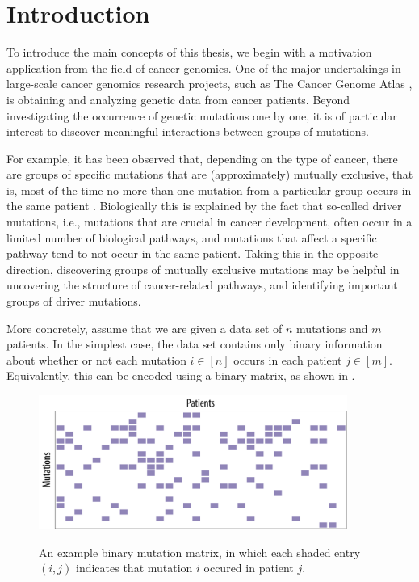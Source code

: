 \chapter{Introduction} \label{ch:intro}
To introduce the main concepts of this thesis, we begin with a motivation application from the field of cancer genomics.
One of the major undertakings in large-scale cancer genomics research projects, such as The Cancer Genome Atlas \citep{tcga}, is obtaining and analyzing genetic data from cancer patients.
Beyond investigating the occurrence of genetic mutations one by one, it is of particular interest to discover meaningful interactions between groups of mutations.

For example, it has been observed that, depending on the type of cancer, there are groups of specific mutations that are (approximately) mutually exclusive, that is, most of the time no more than one mutation from a particular group occurs in the same patient \citep{yeang08}.
Biologically this is explained by the fact that so-called driver mutations, i.e., mutations that are crucial in cancer development, often occur in a limited number of biological pathways, and mutations that affect a specific pathway tend to not occur in the same patient.
Taking this in the opposite direction, discovering groups of mutually exclusive mutations may be helpful in uncovering the structure of cancer-related pathways, and identifying important groups of driver mutations.

More concretely, assume that we are given a data set of $n$ mutations and $m$ patients.
In the simplest case, the data set contains only binary information about whether or not each mutation $i \in [n]$ occurs in each patient $j \in [m]$.
Equivalently, this can be encoded using a binary matrix, as shown in .

\begin{figure}[htb]
\centering
\includegraphics[width=0.9\textwidth]{figures/intro/example1.pdf}\\[1em]
\caption{An example binary mutation matrix, in which each shaded entry $(i, j)$ indicates that mutation $i$ occured in patient $j$.}
\label{fig:bamat_1}
\end{figure}

